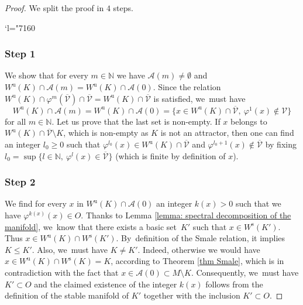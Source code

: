 \documentclass[11pt]{article}
\newcommand{\Changel}{\mathcode`l="7160}
\newcommand{\rs}{\mathrm{s}}
\newcommand{\ru}{\mathrm{u}}
\theoremstyle{definition}
\theoremstyle{plain}
\newcommand{\Acal}{\mathcal{A}}
\newcommand{\N}{\mathbb{N}}
\newcommand{\Vcal}{\mathcal{V}}
\begin{document}
\begin{proof}We split the proof in $4$ steps.

\Changel
\subsubsection*{Step 1} We show that for every $m \in \N$ we have $\Acal(m) \neq \emptyset$ and $W^\ru (K) \cap \Acal(m) = W^\ru (K) \cap \Acal(0)$. Since the relation $W^\ru (K) \cap \varphi^{m} (\overline{\Vcal}) \cap \overline{\Vcal} = W^\ru (K) \cap \overline{\Vcal}$ is satisfied, we~must have
\[
W^\ru (K)\cap \Acal (m) = W^\ru (K) \cap \Acal (0) = \{ x \in W^\ru (K) \cap \overline{\Vcal}, \: \varphi^{1} (x) \notin \Vcal \}
\]
for all $m \in \N$. Let us prove that the last set is non-empty. If $x$ belongs to \hbox{$W^\ru (K) \cap \overline{\Vcal} \setminus K$}, which is non-empty as $K$ is not an attractor, then one can find an integer $l_0 \geq 0$ such that $\varphi^{l_0}(x) \in W^\ru (K) \cap \overline{\Vcal}$ and $\varphi^{l_0 + 1}(x) \notin \overline{\Vcal}$ by fixing $l_0 = \sup \{ l \in \N, \: \varphi^{l} (x) \in \overline{\Vcal} \}$ (which is finite by definition of $x$).

\subsubsection*{Step 2} We find for every $x$ in $W^\ru (K) \cap \Acal(0)$ an integer $k (x) > 0$ such that we have $\varphi^{k (x)}(x) \in O$. Thanks to Lemma \ref{lemma: spectral decomposition of the manifold}, we~know that there exists a basic set~$K'$ such that $x \in W^\rs (K')$. Thus $x \in W^\ru (K) \cap W^\rs (K')$. By~definition of the Smale relation, it implies $K \leq K'$. Also, we~must have $K \neq K'$. Indeed, otherwise we would have $x \in W^\ru (K) \cap W^\rs (K) = K$, according to Theorem \ref{thm Smale}, which is in contradiction with the fact that $x \in \Acal (0) \subset M\setminus K$. Consequently, we~must have $K' \subset O$ and the claimed existence of the integer $k (x)$ follows from the definition of the stable manifold of $K'$ together with the inclusion $K' \subset O$.


\end{proof}
\end{document}
